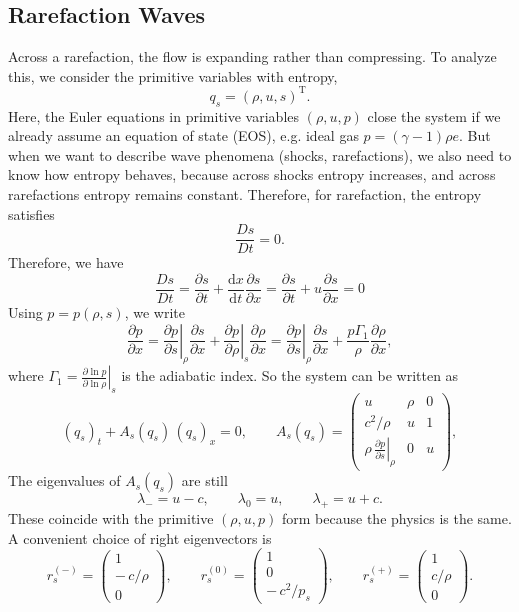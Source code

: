 \documentclass{article}
\begin{document}
\subsection*{Rarefaction Waves}

Across a rarefaction, the flow is expanding rather than compressing.  To analyze this, we consider the primitive variables with entropy,
\[
q_s = (\rho, u, s)^\mathrm{T}.
\]
Here, the Euler equations in primitive variables $(\rho, u, p)$ close the system if we already assume an equation of state (EOS), e.g. ideal gas $p = (\gamma-1)\rho e$. But when we want to describe wave phenomena (shocks, rarefactions), we also need to know how entropy behaves, because across shocks entropy increases, and across rarefactions entropy remains constant. Therefore, for rarefaction, the entropy satisfies
\[
\frac{Ds}{Dt} = 0.
\]
Therefore, we have
\[
\frac{Ds}{Dt} = \frac{\partial s}{\partial t} + \frac{\mathrm{d}x}{\mathrm{d}t}\frac{\partial s}{\partial x} = \frac{\partial s}{\partial t} + u\frac{\partial s}{\partial x} = 0
\]
Using $p = p(\rho,s)$, we write
\begin{equation}
\frac{\partial p}{\partial x} =
\left.\frac{\partial p}{\partial s}\right|_{\rho}\frac{\partial s}{\partial x}
+ \left.\frac{\partial p}{\partial \rho}\right|_{s}\frac{\partial \rho}{\partial x}
= \left.\frac{\partial p}{\partial s}\right|_{\rho}\frac{\partial s}{\partial x}
+ \frac{p \Gamma_1}{\rho}\frac{\partial \rho}{\partial x},
\end{equation}
where $\Gamma_1 = \left.\frac{\partial \ln p}{\partial \ln \rho}\right|_s$ is the adiabatic index. So the system can be written as
\begin{equation}
(q_s)_t + A_s(q_s)\,(q_s)_x = 0,
\qquad
A_s(q_s) =
\begin{pmatrix}
u & \rho & 0 \\
c^2/\rho & u & 1 \\
\displaystyle \rho\,\left.\frac{\partial p}{\partial s}\right|_{\rho} & 0 & u
\end{pmatrix},
\label{eq:entropy-form}
\end{equation}
The eigenvalues of $A_s(q_s)$ are still
\[
\lambda_{-} = u - c,\qquad \lambda_{0} = u,\qquad \lambda_{+} = u + c .
\]
These coincide with the primitive $(\rho,u,p)$ form because the physics is the same. A convenient choice of right eigenvectors is
\begin{equation}
r^{(-)}_s =
\begin{pmatrix}
1 \\[2pt] -\,c/\rho \\[2pt] 0
\end{pmatrix},
\qquad
r^{(0)}_s =
\begin{pmatrix}
1 \\[2pt] 0 \\[2pt] -\,c^2/p_s
\end{pmatrix},
\qquad
r^{(+)}_s =
\begin{pmatrix}
1 \\[2pt] c/\rho \\[2pt] 0
\end{pmatrix}.
\label{eq:right-eig-entropy}
\end{equation}
\end{document}
